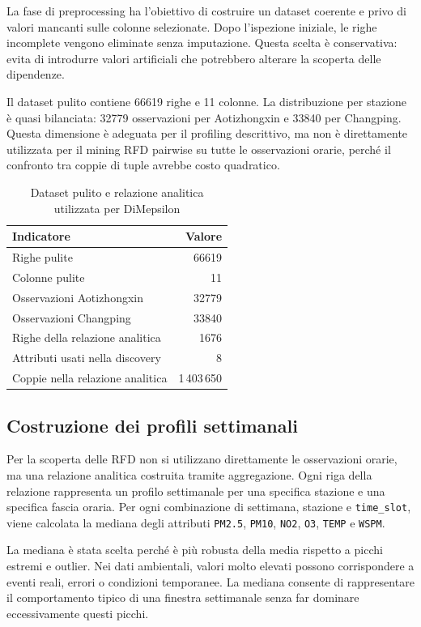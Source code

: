 \documentclass[a4paper,12pt]{article}
\newcommand{\PMdue}{\texttt{PM2.5}}
\newcommand{\PMdieci}{\texttt{PM10}}
\newcommand{\NOdue}{\texttt{NO2}}
\newcommand{\Otre}{\texttt{O3}}
\newcommand{\Temp}{\texttt{TEMP}}
\newcommand{\Wspm}{\texttt{WSPM}}
\newcommand{\TimeSlot}{\texttt{time\_slot}}
\begin{document}
La fase di preprocessing ha l'obiettivo di costruire un dataset coerente e privo di valori mancanti sulle colonne selezionate. Dopo l'ispezione iniziale, le righe incomplete vengono eliminate senza imputazione. Questa scelta è conservativa: evita di introdurre valori artificiali che potrebbero alterare la scoperta delle dipendenze.

Il dataset pulito contiene 66619 righe e 11 colonne. La distribuzione per stazione è quasi bilanciata: 32779 osservazioni per Aotizhongxin e 33840 per Changping. Questa dimensione è adeguata per il profiling descrittivo, ma non è direttamente utilizzata per il mining RFD pairwise su tutte le osservazioni orarie, perché il confronto tra coppie di tuple avrebbe costo quadratico.

\begin{table}[H]
\centering
\caption{Dataset pulito e relazione analitica utilizzata per DiMepsilon}
\begin{tabular}{lr}
\toprule
Indicatore & Valore \\
\midrule
Righe pulite & 66619 \\
Colonne pulite & 11 \\
Osservazioni Aotizhongxin & 32779 \\
Osservazioni Changping & 33840 \\
Righe della relazione analitica & 1676 \\
Attributi usati nella discovery & 8 \\
Coppie nella relazione analitica & 1\,403\,650 \\
\bottomrule
\end{tabular}
\end{table}

\subsection{Costruzione dei profili settimanali}

Per la scoperta delle RFD non si utilizzano direttamente le osservazioni orarie, ma una relazione analitica costruita tramite aggregazione. Ogni riga della relazione rappresenta un profilo settimanale per una specifica stazione e una specifica fascia oraria. Per ogni combinazione di settimana, stazione e \TimeSlot, viene calcolata la mediana degli attributi \PMdue, \PMdieci, \NOdue, \Otre, \Temp{} e \Wspm.

La mediana è stata scelta perché è più robusta della media rispetto a picchi estremi e outlier. Nei dati ambientali, valori molto elevati possono corrispondere a eventi reali, errori o condizioni temporanee. La mediana consente di rappresentare il comportamento tipico di una finestra settimanale senza far dominare eccessivamente questi picchi.
\end{document}
